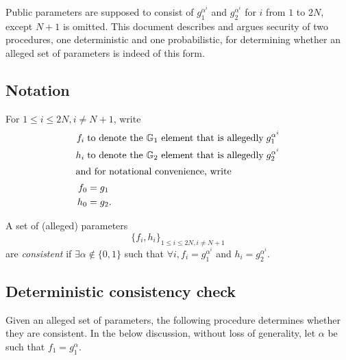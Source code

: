 \documentclass{article}
\newcommand{\G}{\mathbb{G}}
\begin{document}
Public parameters are supposed to consist of $g_1^{\alpha^i}$ and $g_2^{\alpha^i}$ for $i$ from $1$ to $2N$, except $N+1$ is omitted. This document describes and argues security of two procedures, one deterministic and one probabilistic, for determining whether an alleged set of parameters is indeed of this form.

\subsection*{Notation}

For $1 \le i \le 2N, i \ne N+1$, write
\begin{align*}
f_i \; &\text{to denote the $\G_1$ element that is allegedly} \; g_1^{\alpha^i} \\
h_i \; &\text{to denote the $\G_2$ element that is allegedly} \; g_2^{\alpha^i} \\
\intertext{and for notational convenience, write}
f_0 &= g_1 \\
h_0 &= g_2.
\end{align*}

A set of (alleged) parameters \[
\{f_i, h_i\}_{1 \le i \le 2N, i \ne N+1}
\]
are \textit{consistent} if $\exists \alpha \notin\{0,1\}$ such that $\forall i, f_i = g_1^{\alpha^i}$ and $h_i = g_2^{\alpha^i}$.

\subsection*{Deterministic consistency check}
Given an alleged set of parameters, the following procedure determines whether they are consistent. In the below discussion, without loss of generality, let $\alpha$ be such that $f_1 = g_1^{\alpha}$.
\end{document}
